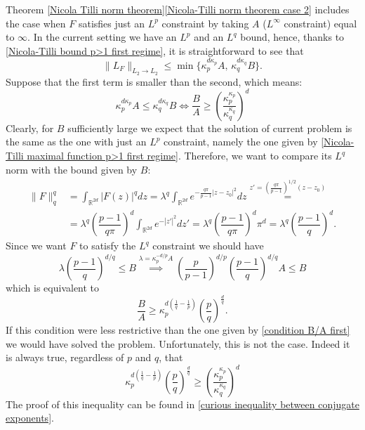 \documentclass[corpo=11pt, stile=classica, tipotesi=custom,
greek, evenboxes, english]{toptesi}
\numberwithin{equation}{chapter}
\theoremstyle{remark}
\newcommand{\R}{\mathbb{R}} %
\begin{document}
Theorem \ref{Nicola Tilli norm theorem}\ref{Nicola-Tilli norm theorem case 2} includes the case when $F$ satisfies just an $L^p$ constraint by taking $A$ ($L^{\infty}$ constraint) equal to $\infty$. In the current setting we have an $L^p$ and an $L^q$ bound, hence, thanks to \ref{Nicola-Tilli bound p>1 first regime}, it is straightforward to see that
\begin{equation*}
	\| L_F\|_{L_2 \rightarrow L_2} \leq \min\{\kappa_p^{d\kappa_p}A, \, \kappa_q^{d\kappa_q}B\}.
\end{equation*}
Suppose that the first term is smaller than the second, which means:
\begin{equation}\label{condition B/A first}
	\kappa_p^{d\kappa_p}A \leq \kappa_q^{d\kappa_q}B \iff \dfrac{B}{A} \geq \left(\dfrac{\kappa_p^{\kappa_p}}{\kappa_q^{\kappa_q}}\right)^d
\end{equation}
Clearly, for $B$ sufficiently large we expect that the solution of current problem is the same as the one with just an $L^p$ constraint, namely the one given by \eqref{Nicola-Tilli maximal function p>1 first regime}. Therefore, we want to compare its $L^q$ norm with the bound given by $B$:
\begin{align*}
	\| F \|_q^q &= \int_{\R^{2d}} |F(z)|^q dz = \lambda^q \int_{\R^{2d}} e^{-\frac{q\pi}{p-1}|z-z_0|^2} dz \overset{z' = \left(\frac{q\pi}{p-1}\right)^{1/2}(z-z_0)}{=}\\
	&= \lambda^q \left(\dfrac{p-1}{q\pi}\right)^d \int_{\R^{2d}} e^{-|z'|^2}dz' = \lambda^q \left(\dfrac{p-1}{q\pi}\right)^d \pi^d = \lambda^q \left(\dfrac{p-1}{q}\right)^d.
\end{align*}
Since we want $F$ to satisfy the $L^q$ constraint we should have
\begin{equation*}
	\lambda \left(\dfrac{p-1}{q}\right)^{d/q} \leq B \overset{\lambda = \kappa_p^{-d/p}A}{\implies} \left(\dfrac{p}{p-1}\right)^{d/p} \left(\dfrac{p-1}{q}\right)^{d/q}A \leq B
\end{equation*}
which is equivalent to
\begin{equation*}\label{condition B/A second}
	\dfrac{B}{A} \geq \kappa_p^{d\left(\frac1q - \frac1p\right)}\left(\dfrac{p}{q}\right)^{\frac{d}{q}}.
\end{equation*}
If this condition were less restrictive than the one given by \eqref{condition B/A first} we would have solved the problem. Unfortunately, this is not the case. Indeed it is always true, regardless of $p$ and $q$, that
\begin{equation}\label{curious inequality between conjugate exponents original}
	\kappa_p^{d\left(\frac1q - \frac1p\right)}\left(\dfrac{p}{q}\right)^{\frac{d}{q}} \geq \left(\dfrac{\kappa_p^{\kappa_p}}{\kappa_q^{\kappa_q}}\right)^d
\end{equation}
The proof of this inequality can be found in \ref{curious inequality between conjugate exponents}.
\end{document}
